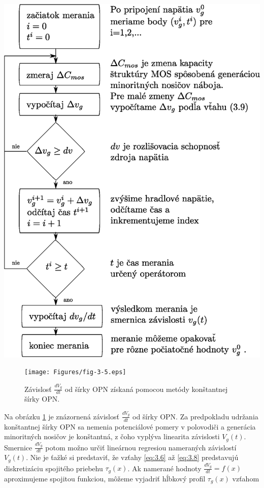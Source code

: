 \begin{diagram}
\includegraphics[scale=0.55,keepaspectratio]{Figures/diagram-2.EPS}
\label{diagram:2}
\end{diagram}

\begin{figure}[h!]\centering
\texttt{[image: Figures/fig-3-5.eps]}
\captionsetup{justification=raggedright, singlelinecheck=false}
\caption[Závislosť $\frac{dV_g}{dt}$ od šírky OPN získaná pomocou
 metódy konštantnej šírky OPN]{Závislosť $\frac{dV_g}{dt}$ od šírky OPN
 získaná pomocou metódy konštantnej šírky OPN.}
\label{fig:3.5}
\end{figure}

Na obrázku \ref{fig:3.5} je znázornená závislosť $\frac{dV_g}{dt}$ od
šírky OPN.  Za predpokladu udržania konštantnej šírky OPN sa nemenia
potenciálové pomery v polovodiči a generácia minoritných nosičov je
konštantná, z čoho vyplýva linearita závislosti $V_g(t)$.  Smernice
$\frac{dV_g}{dt}$ potom možno určiť lineárnou regresiou nameraných
závislostí $V_g(t)$. Nie je ťažké si predstaviť, že vzťahy
\ref{eq:3.6} až \ref{eq:3.8} predstavujú diskretizáciu spojitého
priebehu $\tau_g(x)$. Ak namerané hodnoty $\frac{dV_g}{dt}=f(x)$
aproximujeme spojitou funkciou, môžeme vyjadriť hĺbkový profil
$\tau_g(x)$ vzťahom


